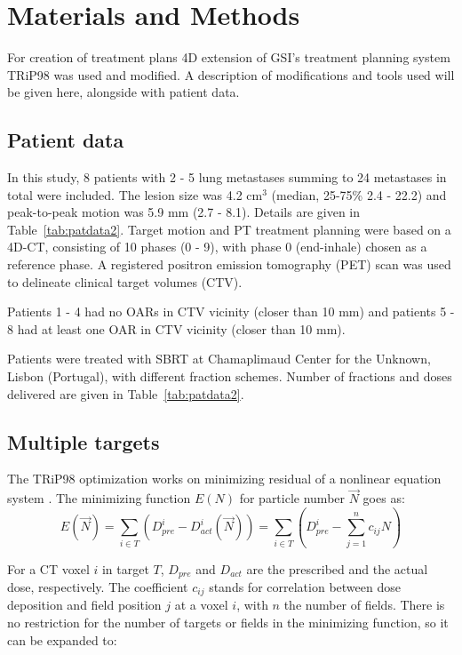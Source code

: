 \documentclass[type=dr, dr=rernat, accentcolor=tud7b,colorbacktitle, bigchapter, openright, twoside, 12pt ]{tudthesis}
\begin{document}
\section{Materials and Methods}

For creation of treatment plans 4D extension of GSI's treatment planning system TRiP98 \cite{Kraemer2000a, Richter2013} was used and modified. A description of modifications and tools used will be given here, 
alongside with patient data.

\subsection{Patient data}


In this study, 8 patients with 2 - 5 lung metastases summing to 24 metastases in total were included. The lesion size was 4.2 cm$^3$ (median, 25-75\% 2.4 - 22.2) and peak-to-peak motion was 5.9 mm (2.7 - 8.1). 
Details are given in Table~\ref{tab:patdata2}.
Target motion and PT treatment planning were based on a 4D-CT, consisting of 10 phases (0 - 9), with phase 0 (end-inhale) chosen as a reference phase.
A registered positron emission tomography (PET) scan was used to delineate clinical target volumes (CTV). 

Patients 1 - 4 had no OARs in CTV vicinity (closer than 10 mm) and patients 5 - 8 had at least one OAR in CTV vicinity (closer than 10 mm).

Patients were treated with SBRT at Chamaplimaud Center for the Unknown, Lisbon (Portugal), with different fraction schemes. Number of fractions and doses delivered are given in Table~\ref{tab:patdata2}. 

\subsection{Multiple targets}

The TRiP98 optimization works on minimizing residual of a nonlinear equation system \cite{Kraemer2000a}. The minimizing function $E(N)$ for particle number $\vec{N}$ goes as:
\begin{equation}
\label{eq-costFunc}
 E(\vec{N}) = \sum_{i\in T} \left( D_{pre}^{i} - D_{act}^{i}(\vec{N})\right) = \sum_{i\in T} \left( D_{pre}^{i} -\sum_{j=1}^n c_{ij}N\right)
\end{equation}

For a CT voxel $i$ in target $T$, $ D_{pre}$ and $D_{act}$ are the prescribed and the actual dose, respectively. The coefficient $c_{ij}$ stands for correlation between dose deposition and field position $j$ at a voxel $i$, 
with $n$ the number of fields. There is no restriction for the number of targets or fields in the minimizing function, so it can be expanded to:
\end{document}
